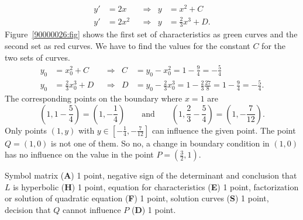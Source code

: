 \begin{loesung}
\begin{teilaufgaben}
\begin{align*}
y'&=2x   &&\Rightarrow& y&=x^2 + C \\
y'&=2x^2 &&\Rightarrow& y&=\frac23 x^3 + D.
\end{align*}
Figure~\ref{90000026:fig} shows the first set of characteristics
as green curves and the second set as red curves.
We have to find the values for the constant $C$ for the two sets of
curves.
\begin{align*}
	y_0 &= x_0^2 + C         &&\Rightarrow& C &= y_0 - x_0^2 = 1-\frac{9}{4} = -\frac{5}{4}\\
	y_0 &= \frac23 x_0^3 + D &&\Rightarrow& D &= y_0 -\frac23x_0^3 = 1 - \frac{2}{3}\frac{27}{8} = 1-\frac{9}{4} = -\frac{5}{4}.
\end{align*}
The corresponding points on the boundary where $x=1$ are
\[
(1,1-{\textstyle\frac54})
=
(1,-\textstyle{\frac14})
\qquad\text{and}\qquad
(1,{\textstyle\frac23}-{\textstyle\frac54})
=(1,-{\textstyle\frac{7}{12}}).
\]
Only points $(1,y)$ with $y\in[ -\frac{1}{4}, -\frac{7}{12} ]$ can
influence the given point.
The point $Q=(1,0)$ is not one of them.
So no, a change in boundary condition in $(1,0)$ has no influence on
the value in the point $P=(\frac32,1)$.
\qedhere
\end{teilaufgaben}
\end{loesung}

\begin{bewertung}
Symbol matrix ({\bf A}) 1 point,
negative sign of the determinant and conclusion that $L$ is hyperbolic
({\bf H}) 1 point,
equation for characteristics ({\bf E}) 1 point,
factorization or solution of quadratic equation ({\bf F}) 1 point,
solution curves ({\bf S}) 1 point,
decision that $Q$ cannot influence $P$ ({\bf D}) 1 point.
\end{bewertung}

